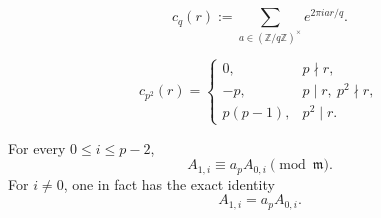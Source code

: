 \documentclass[10pt,a4paper]{amsart}
\newcommand{\Z}{\mathbb{Z}}
\begin{document}
\begin{equation}\label{ramsum}c_q(r)
        :=
        \sum_{a\in(\Z/q\Z)^\times}
        e^{2\pi i ar/q}.
\end{equation}

\begin{equation}
\label{eq:ramanujan-p2}
        c_{p^2}(r)
        =
        \begin{cases}
        0,&p\nmid r,\\
        -p,&p\mid r,\ p^2\nmid r,\\
        p(p-1),&p^2\mid r.
        \end{cases}
\end{equation}

\begin{lemma}
\label{lem:A1-A0}
For every \(0\leq i\leq p-2\),
\begin{equation}
\label{eq:A1-A0}
        A_{1,i}
        \equiv
        a_pA_{0,i}
        \pmod{\mathfrak m}.
\end{equation}
For \(i\neq0\), one in fact has the exact identity
\[
        A_{1,i}=a_pA_{0,i}.
\]
\end{lemma}
\end{document}
